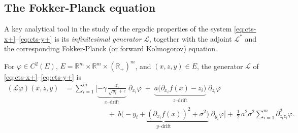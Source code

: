 \documentclass[11pt, a4paper,leqno]{amsart}
\theoremstyle{definition}
\numberwithin{equation}{section}
\begin{document}
\subsection{The Fokker-Planck equation}\label{FP}



A key analytical tool in the study of the ergodic properties of the system
\eqref{eq:cts-x+}–\eqref{eq:cts-y+} is its \emph{infinitesimal generator}
${\mathcal{L}}$, together with the adjoint ${\mathcal{L}}^{\!*}$ and the corresponding
Fokker-Planck (or forward Kolmogorov) equation.




For $\varphi \in C^2(E)$, $E=\mathbb{R}^m\times\mathbb{R}^m\times(\mathbb{R}_+)^m$, and $(x,z,y)\in E$,
the generator ${\mathcal{L}}$ of \eqref{eq:cts-x+}–\eqref{eq:cts-y+} is
\begin{equation}\label{generator}
\begin{aligned}
({\mathcal{L}}\varphi)(x,z,y)
&= \sum_{i=1}^m \Bigg[
\underbrace{-\gamma\,\frac{z_i}{\sqrt{y_i}+\varepsilon}}_{\text{$x$–drift}}\;\partial_{x_i}\varphi
\;+\;
\underbrace{a\big(\partial_{x_i}f(x)-z_i\big)}_{\text{$z$–drift}}\;\partial_{z_i}\varphi
\\[-0.25em]
&\hspace{6em}+\;
\underbrace{b\Big(-y_i+(\partial_{x_i}f(x))^2+\sigma^2\Big)}_{\text{$y$–drift}}\;\partial_{y_i}\varphi
\Bigg]
+\;\frac12\,a^2\sigma^2\sum_{i=1}^m \partial_{z_i z_i}^2 \varphi.
\end{aligned}
\end{equation}
\end{document}
